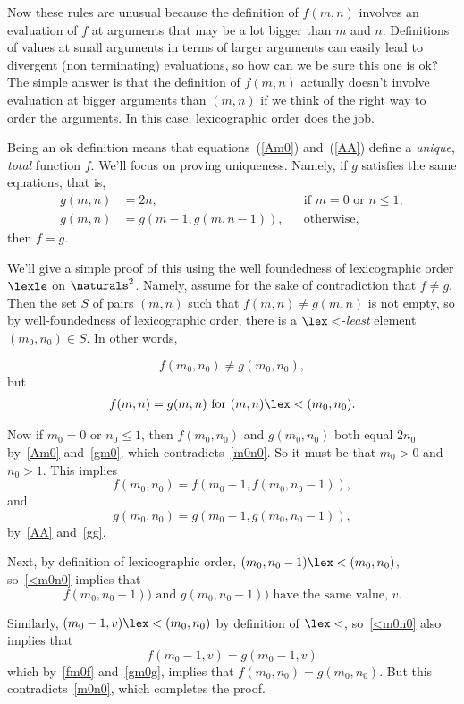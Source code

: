 Now these rules are unusual because the definition of $f(m,n)$ involves an
evaluation of $f$ at arguments that may be a lot bigger than $m$ and $n$.
Definitions of values at small arguments in terms of larger arguments can
easily lead to divergent (non terminating) evaluations, so how can we be
sure this one is ok?  The simple answer is that the definition of $f(m,n)$
actually doesn't involve evaluation at bigger arguments than $(m,n)$ if we
think of the right way to order the arguments.  In this case,
lexicographic order does the job.

Being an ok definition means that equations~(\ref{Am0}) and~(\ref{AA})
define a \emph{unique}, \emph{total} function $f$.  We'll focus on
proving uniqueness.  Namely, if $g$ satisfies the same equations, that is,
\begin{align}
g(m,n) &=  2n, &&\text{if $m=0$ or $n \le 1$},\label{gm0}\\ 
g(m,n) &=  g(m-1,g(m,n-1)), &&\text{otherwise},\label{gg}
\end{align}
then $f=g$.

We'll give a simple proof of this using the well foundedness of
lexicographic order $\lexle$ on $\naturals^2$.  Namely, assume for the
sake of contradiction that $f \neq g$.  Then the set $S$ of pairs
$(m,n)$ such that $f(m,n) \ne g(m,n)$ is not empty, so by well-foundedness
of lexicographic order, there is a $\lex<$-\emph{least} element $(m_0,n_0)
\in S$.  In other words,

\begin{equation}\label{m0n0}
f(m_0,n_0) \neq g(m_0,n_0),
\end{equation}
but
\begin{eqnarray}\label{<m0n0}
f(m,n) = g(m,n) \text{ for } (m,n) \lex< (m_0,n_0).
\end{eqnarray}

Now if $m_0 = 0$ or $n_0 \le 1$, then $f(m_0,n_0)$ and $g(m_0,n_0)$ both
equal $2n_0$ by~\eqref{Am0} and~\eqref{gm0}, which
contradicts~\eqref{m0n0}.  So it must be that $m_0 >0$ and $n_0 > 1$.
This implies
\begin{equation}\label{fm0f}
f(m_0,n_0) = f(m_0-1,f(m_0,n_0-1)),
\end{equation}
and
\begin{equation}\label{gm0g}
g(m_0,n_0) = g(m_0-1,g(m_0,n_0-1)),
\end{equation}
by~\eqref{AA} and~\eqref{gg}.

Next, by definition of lexicographic order, $(m_0,n_0-1) \lex< (m_0,n_0)$,
so~\eqref{<m0n0} implies that
\[f(m_0,n_0-1)) \text{ and } g(m_0,n_0-1))\text{ have the same value, } v.
\]

Similarly, $(m_0-1,v)\lex< (m_0,n_0)$ by definition of $\lex<$,
so~\eqref{<m0n0} also implies that
\begin{equation}
f(m_0-1,v) = g(m_0-1,v)
\end{equation}
which by~\eqref{fm0f} and~\eqref{gm0g}, implies that $f(m_0,n_0) =
g(m_0,n_0)$.  But this contradicts~\eqref{m0n0}, which completes the
proof.


\endinput
